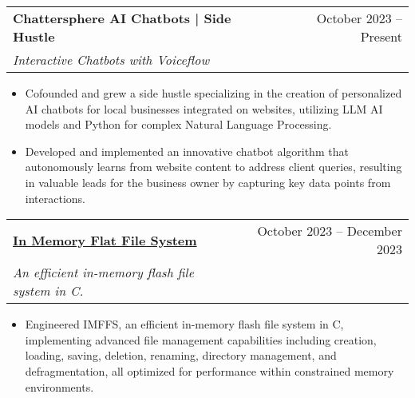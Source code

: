 \documentclass[letterpaper,11pt]{article}
\makeatletter
\newcommand{\resumeItem}[1]{
  \item\small{
    {#1 \vspace{-2pt}}
  }
}
\newcommand{\resumeSubheading}[4]{
  \vspace{-2pt}\item
    \begin{tabular*}{0.97\textwidth}[t]{l@{\extracolsep{\fill}}r}
      \textbf{#1} & #2 \\
      \textit{\small#3} & \textit{\small #4} \\
    \end{tabular*}\vspace{-4pt} %
}
\newcommand{\resumeSubHeadingListEnd}{\end{itemize}}
\newcommand{\resumeItemListStart}{\begin{itemize}}
\newcommand{\resumeItemListEnd}{\end{itemize}\vspace{-6pt}} %
\makeatother
\begin{document}
    \resumeSubheading
      {Chattersphere AI Chatbots | Side Hustle}{October 2023 -- Present}
      {Interactive Chatbots with Voiceflow}{}
      \resumeItemListStart
        \resumeItem{Cofounded and grew a side hustle specializing in the creation of personalized AI chatbots for local businesses integrated on websites, utilizing LLM AI models and Python for complex Natural Language Processing.}
        \resumeItem{Developed and implemented an innovative chatbot algorithm that autonomously learns from website content to address client queries, resulting in valuable leads for the business owner by capturing key data points from interactions.}
      \resumeItemListEnd

      \vspace{-4pt} %

      \resumeSubheading
      {\href{https://github.com/Ali90922/In-memory-flat-file-system}{In Memory Flat File System}}{October 2023 -- December 2023}
      {An efficient in-memory flash file system in C.}{}
      \resumeItemListStart
        \resumeItem{Engineered IMFFS, an efficient in-memory flash file system in C, implementing advanced file management capabilities including creation, loading, saving, deletion, renaming, directory management, and defragmentation, all optimized for performance within constrained memory environments.}
      
\resumeSubHeadingListEnd
\end{document}
